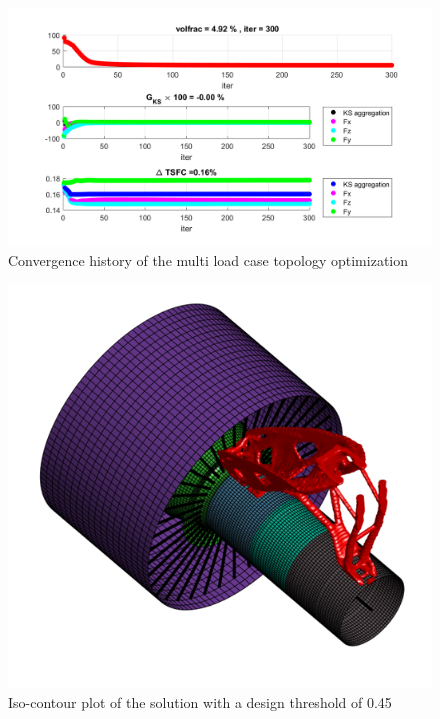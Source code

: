  \begin{figure}[ht]
  \centering
  \includegraphics[width=\textwidth]{images/Ch2/convergence_300_mlcs}
  \caption{Convergence history of the multi load case topology optimization}
  \label{fig.2.24}
  \end{figure}
   \begin{figure}[ht]
    \centering
    \includegraphics[width=\textwidth]{images/Ch2/MLCS_solution}
    \caption{Iso-contour plot of the solution with a design threshold of 0.45}
    \label{fig.2.25}
    \end{figure}
